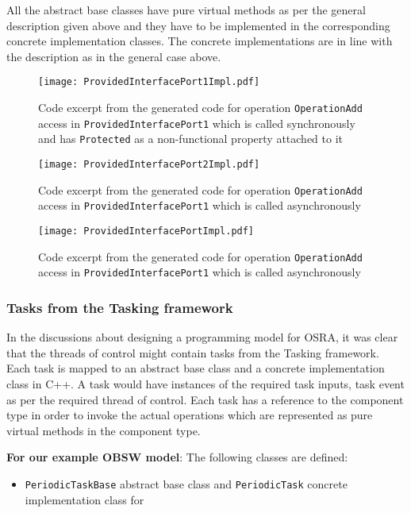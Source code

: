 All the abstract base classes have pure virtual methods as per the general description given above and they have to be implemented in the corresponding concrete implementation classes. The concrete implementations are in line with the description as in the general case above.

\begin{figure}[h]
	\centering
	\texttt{[image: ProvidedInterfacePort1Impl.pdf]}
	\caption{Code excerpt from the generated code for operation \texttt{OperationAdd} access in \texttt{Provided\allowbreak Interface\allowbreak Port1} which is called synchronously and has \texttt{Protected} as a non-functional property attached to it}
	\label{fig: Provided interface port1 Impl}
\end{figure}

\begin{figure}[h]
	\centering
	\texttt{[image: ProvidedInterfacePort2Impl.pdf]}
	\caption{Code excerpt from the generated code for operation \texttt{OperationAdd} access in \texttt{Provided\allowbreak Interface\allowbreak Port1} which is called asynchronously}
	\label{fig: Provided interface port2 Impl}
\end{figure}

\begin{figure}[h]
	\centering
	\texttt{[image: ProvidedInterfacePortImpl.pdf]}
	\caption{Code excerpt from the generated code for operation \texttt{OperationAdd} access in \texttt{Provided\allowbreak Interface\allowbreak Port1} which is called asynchronously}
	\label{fig: Provided interface port Impl}
\end{figure}

\subsubsection{\textbf{Tasks from the Tasking framework}}
In the discussions about designing a programming model for OSRA, it was clear that the threads of control might contain tasks from the Tasking framework. Each task is mapped to an abstract base class and a concrete implementation class in C++. A task would have instances of the required task inputs, task event as per the required thread of control. Each task has a reference to the component type in order to invoke the actual operations which are represented as pure virtual methods in the component type.

\textbf{For our example OBSW model}: The following classes are defined:
\begin{itemize}
\item \texttt{Periodic\allowbreak TaskBase} abstract base class and \texttt{PeriodicTask} concrete implementation class for 
\end{itemize} 

